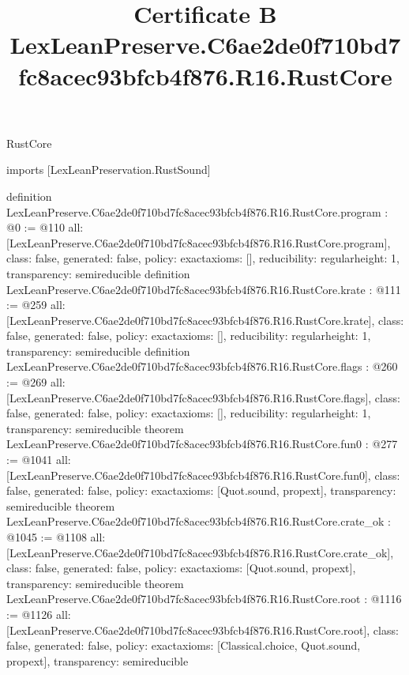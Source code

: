 \begin{lexlean}{RustCore}
\title{Certificate B LexLeanPreserve.C6ae2de0f710bd7fc8acec93bfcb4f876.R16.RustCore}
\begin{coremodule}
imports [LexLeanPreservation.RustSound]

definition LexLeanPreserve.C6ae2de0f710bd7fc8acec93bfcb4f876.R16.RustCore.program : @0 := @110 {
  all: [LexLeanPreserve.C6ae2de0f710bd7fc8acec93bfcb4f876.R16.RustCore.program],
  class: false,
  generated: false,
  policy: exact{axioms: []},
  reducibility: regular{height: 1},
  transparency: semireducible
}
definition LexLeanPreserve.C6ae2de0f710bd7fc8acec93bfcb4f876.R16.RustCore.krate : @111 := @259 {
  all: [LexLeanPreserve.C6ae2de0f710bd7fc8acec93bfcb4f876.R16.RustCore.krate],
  class: false,
  generated: false,
  policy: exact{axioms: []},
  reducibility: regular{height: 1},
  transparency: semireducible
}
definition LexLeanPreserve.C6ae2de0f710bd7fc8acec93bfcb4f876.R16.RustCore.flags : @260 := @269 {
  all: [LexLeanPreserve.C6ae2de0f710bd7fc8acec93bfcb4f876.R16.RustCore.flags],
  class: false,
  generated: false,
  policy: exact{axioms: []},
  reducibility: regular{height: 1},
  transparency: semireducible
}
theorem LexLeanPreserve.C6ae2de0f710bd7fc8acec93bfcb4f876.R16.RustCore.fun0 : @277 := @1041 {
  all: [LexLeanPreserve.C6ae2de0f710bd7fc8acec93bfcb4f876.R16.RustCore.fun0],
  class: false,
  generated: false,
  policy: exact{axioms: [Quot.sound, propext]},
  transparency: semireducible
}
theorem LexLeanPreserve.C6ae2de0f710bd7fc8acec93bfcb4f876.R16.RustCore.crate_ok : @1045 := @1108 {
  all: [LexLeanPreserve.C6ae2de0f710bd7fc8acec93bfcb4f876.R16.RustCore.crate_ok],
  class: false,
  generated: false,
  policy: exact{axioms: [Quot.sound, propext]},
  transparency: semireducible
}
theorem LexLeanPreserve.C6ae2de0f710bd7fc8acec93bfcb4f876.R16.RustCore.root : @1116 := @1126 {
  all: [LexLeanPreserve.C6ae2de0f710bd7fc8acec93bfcb4f876.R16.RustCore.root],
  class: false,
  generated: false,
  policy: exact{axioms: [Classical.choice, Quot.sound, propext]},
  transparency: semireducible
}


\end{coremodule}
\end{lexlean}

